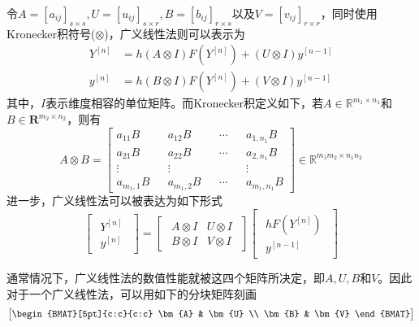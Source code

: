 令$A=[a_{ij}]_{s\times s},U=[u_{ij}]_{s\times r},B=[b_{ij}]_{r\times s}$以及$V=[v_{ij}]_{r\times r}$，同时使用Kronecker积符号($\otimes$)，广义线性法则可以表示为
\begin{align}
Y^{[n]}&=h(A\otimes I)F(Y^{[n]})+(U\otimes I)y^{[n-1]}\\
y^{[n]}&=h(B\otimes I)F(Y^{[n]})+(V\otimes I)y^{[n-1]}
\end{align}
其中，$I$表示维度相容的单位矩阵。而Kronecker积定义如下，若$A\in\mathbb{R}^{m_1\times n_1}$和$B\in\bm{R}^{m_2\times n_2}$，则有
\begin{equation}
A\otimes B=\begin{bmatrix}
a_{11} B&&a_{12}B&&\cdots && a_{1,n_1} B\\
a_{21}B&&a_{22}B&&\cdots && a_{2,n_1}B\\
\vdots &&\vdots && &&\vdots\\
a_{m_1,1}B &&a_{m_1,2}B&&\cdots &&a_{m_1,n_1}B
\end{bmatrix}\in\mathbb{R}^{m_1m_2\times n_1n_2}
\end{equation}
进一步，广义线性法可以被表达为如下形式
\begin{equation}
\begin{bmatrix}
\begin{array}{c}
Y^{[n]}\\ \hline
y^{[n]}
\end{array}
\end{bmatrix}=\begin{bmatrix}
\begin{array}{c|c}
A\otimes I & U\otimes I \\ \hline
B\otimes I & V\otimes I
\end{array}
\end{bmatrix}\begin{bmatrix}
\begin{array}{c}
hF(Y^{[n]})\\ \hline
y^{[n-1]}
\end{array}
\end{bmatrix}\label{eq:ch2GLM}
\end{equation}

通常情况下，广义线性法的数值性能就被这四个矩阵所决定，即$A,U,B$和$V$。因此对于一个广义线性法，可以用如下的分块矩阵刻画
\begin{equation}
\begin{bmatrix}
\begin{BMAT}[5pt]{c:c}{c:c}
	\bm{A} & \bm{U} \\
	\bm{B} & \bm{V}
\end{BMAT}
\end{bmatrix}
\end{equation}

